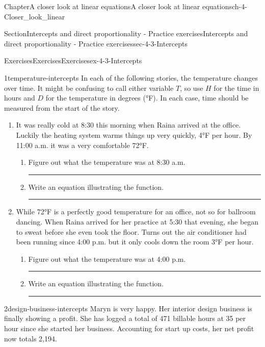 \documentclass[twoside,11pt,]{book}
\newlength{\workspacestrutwidth}
\numberwithin{equation}{section}
\begin{document}
\begin{chapterptx}{Chapter}{A closer look at linear equations}{}{A closer look at linear equations}{}{}{ch-4-Closer_look_linear}
\begin{sectionptx}{Section}{Intercepts and direct proportionality - Practice exercises}{}{Intercepts and direct proportionality - Practice exercises}{}{}{sec-4-3-Intercepts}
%
%
\typeout{************************************************}
\typeout{************************************************}
%
\begin{exercises-subsection-numberless}{Exercises}{Exercises}{}{Exercises}{}{}{ex-4-3-Intercepts}
\begin{divisionexercise}{1}{}{}{temperature-intercepts}%
In each of the following stories, the temperature changes over time. It might be confusing to call either variable \(T\), so use \(H\) for the time in hours and \(D\) for the temperature in degrees (°F). In each case, time should be measured from the start of the story.%
\begin{enumerate}[label=(\alph*),ref=\alph*]%
\item{}It was really cold at 8:30 this morning when Raina arrived at the office. Luckily the heating system warms things up very quickly, 4°F per hour. By 11:00 a.m. it was a very comfortable 72°F.%
\begin{enumerate}[label=\roman*.,ref=\theenumi.\roman*]%
\item{}Figure out what the temperature was at 8:30 a.m.%
\par\rule{\workspacestrutwidth}{1in}%
\item{}Write an equation illustrating the function.%
\par\rule{\workspacestrutwidth}{1in}%
\end{enumerate}%
\item{}While 72°F is a perfectly good temperature for an office, not so for ballroom dancing. When Raina arrived for her practice at 5:30 that evening, she began to sweat before she even took the floor. Turns out the air conditioner had been running since 4:00 p.m. but it only cools down the room 3°F per hour.%
\begin{enumerate}[label=\roman*.,ref=\theenumi.\roman*]%
\item{}Figure out what the temperature was at 4:00 p.m.%
\par\rule{\workspacestrutwidth}{1in}%
\item{}Write an equation illustrating the function.%
\par\rule{\workspacestrutwidth}{1in}%
\end{enumerate}%
\end{enumerate}%
\end{divisionexercise}%
\clearpage
\begin{divisionexercise}{2}{}{}{design-business-intercepts}%
Maryn is very happy. Her interior design business is finally showing a profit. She has logged a total of 471 billable hours at \textdollar{}35 per hour since she started her business. Accounting for start up costs, her net profit now totals \textdollar{}2,194.%

\end{divisionexercise}
\end{exercises-subsection-numberless}
\end{sectionptx}
\end{chapterptx}
\end{document}
